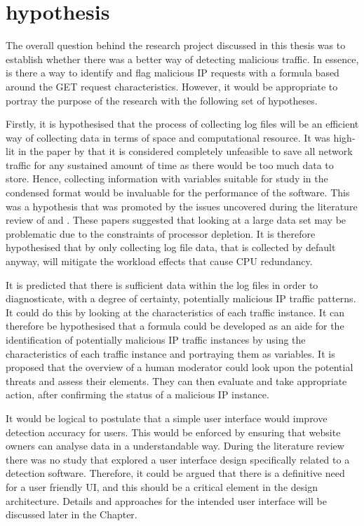 \section{hypothesis}

The overall question behind the research project discussed in this thesis was to establish whether there was a better way of detecting malicious traffic. In essence, is there a way to identify and flag malicious IP requests with a formula based around the GET request characteristics. However, it would be appropriate to portray the purpose of the research with the following set of hypotheses.

Firstly, it is hypothesised that the process of collecting log files will be an efficient way of collecting data in terms of space and computational resource. It was high-lit in the \citeyear{staniford2002practical} paper by \citeauthor{staniford2002practical} that it is considered completely unfeasible to save all network traffic for any sustained amount of time as there would be too much data to store. Hence, collecting information with variables suitable for study in the condensed format would be invaluable for the performance of the software. This was a hypothesis that was promoted by the issues uncovered during the literature review of \cite{Adi2015} and \cite{Adi2016}. These papers suggested that looking at a large data set may be problematic due to the constraints of processor depletion. It is therefore hypothesised that by only collecting log file data, that is collected by default anyway, will mitigate the workload effects that cause CPU redundancy.

It is predicted that there is sufficient data within the log files in order to diagnosticate, with a degree of certainty, potentially malicious IP traffic patterns. It could do this by looking at the characteristics of each traffic instance. It can therefore be hypothesised that a formula could be developed as an aide for the identification of potentially malicious IP traffic instances by using the characteristics of each traffic instance and portraying them as variables. It is proposed that the overview of a human moderator could look upon the potential threats and assess their elements. They can then evaluate and take appropriate action, after confirming the status of a malicious IP instance.

It would be logical to postulate that a simple user interface would improve detection accuracy for users. This would be enforced by ensuring that website owners can analyse data in a understandable way. During the literature review there was no study that explored a user interface design specifically related to a detection software. Therefore, it could be argued that there is a definitive need for a user friendly UI, and this should be a critical element in the design architecture. Details and approaches for the intended user interface will be discussed later in the Chapter.

